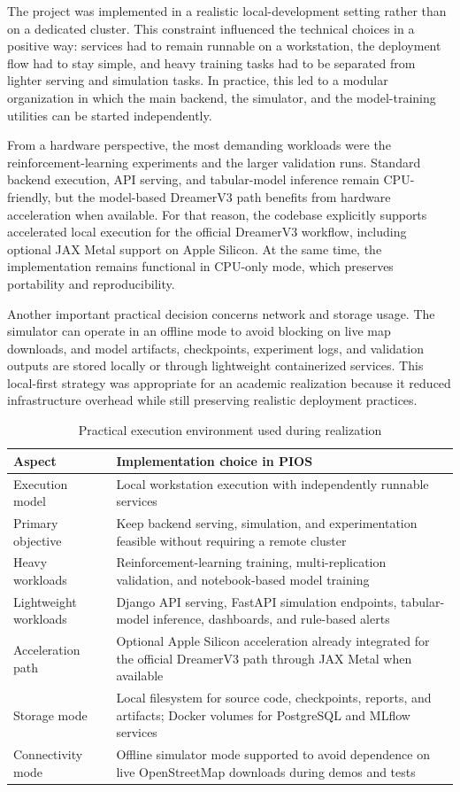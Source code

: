 The project was implemented in a realistic local-development setting rather than on a dedicated cluster. This constraint influenced the technical choices in a positive way: services had to remain runnable on a workstation, the deployment flow had to stay simple, and heavy training tasks had to be separated from lighter serving and simulation tasks. In practice, this led to a modular organization in which the main backend, the simulator, and the model-training utilities can be started independently.

From a hardware perspective, the most demanding workloads were the reinforcement-learning experiments and the larger validation runs. Standard backend execution, API serving, and tabular-model inference remain CPU-friendly, but the model-based DreamerV3 path benefits from hardware acceleration when available. For that reason, the codebase explicitly supports accelerated local execution for the official DreamerV3 workflow, including optional JAX Metal support on Apple Silicon. At the same time, the implementation remains functional in CPU-only mode, which preserves portability and reproducibility.

Another important practical decision concerns network and storage usage. The simulator can operate in an offline mode to avoid blocking on live map downloads, and model artifacts, checkpoints, experiment logs, and validation outputs are stored locally or through lightweight containerized services. This local-first strategy was appropriate for an academic realization because it reduced infrastructure overhead while still preserving realistic deployment practices.

\begin{table}[htbp]
\centering
\caption{Practical execution environment used during realization}
\label{tab:hardware-environment}
\small
\begin{tabular}{@{}lp{9.7cm}@{}}
\toprule
\textbf{Aspect} & \textbf{Implementation choice in PIOS} \\
\midrule
Execution model & Local workstation execution with independently runnable services \\
Primary objective & Keep backend serving, simulation, and experimentation feasible without requiring a remote cluster \\
Heavy workloads & Reinforcement-learning training, multi-replication validation, and notebook-based model training \\
Lightweight workloads & Django API serving, FastAPI simulation endpoints, tabular-model inference, dashboards, and rule-based alerts \\
Acceleration path & Optional Apple Silicon acceleration already integrated for the official DreamerV3 path through JAX Metal when available \\
Storage mode & Local filesystem for source code, checkpoints, reports, and artifacts; Docker volumes for PostgreSQL and MLflow services \\
Connectivity mode & Offline simulator mode supported to avoid dependence on live OpenStreetMap downloads during demos and tests \\
\bottomrule
\end{tabular}
\end{table}

